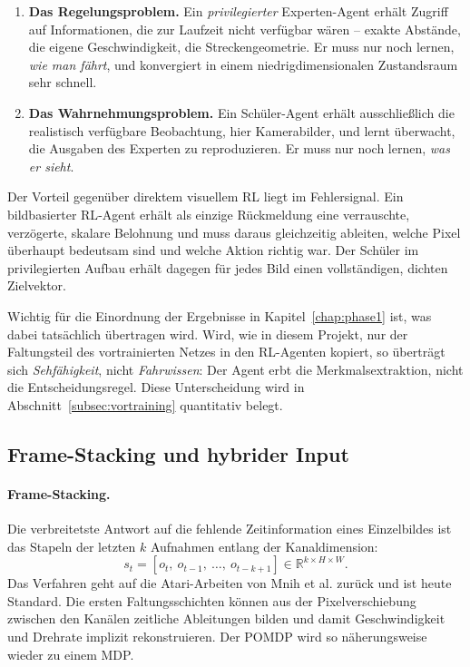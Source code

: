 \begin{enumerate}
  \item \textbf{Das Regelungsproblem.} Ein \emph{privilegierter} Experten-Agent erhält Zugriff auf Informationen, die zur Laufzeit nicht verfügbar wären -- exakte Abstände, die eigene Geschwindigkeit, die Streckengeometrie. Er muss nur noch lernen, \emph{wie man fährt}, und konvergiert in einem niedrigdimensionalen Zustandsraum sehr schnell.
  \item \textbf{Das Wahrnehmungsproblem.} Ein Schüler-Agent erhält ausschließlich die realistisch verfügbare Beobachtung, hier Kamerabilder, und lernt überwacht, die Ausgaben des Experten zu reproduzieren. Er muss nur noch lernen, \emph{was er sieht}.
\end{enumerate}

Der Vorteil gegenüber direktem visuellem \ac{RL} liegt im Fehlersignal. Ein bildbasierter \ac{RL}-Agent erhält als einzige Rückmeldung eine verrauschte, verzögerte, skalare Belohnung und muss daraus gleichzeitig ableiten, welche Pixel überhaupt bedeutsam sind und welche Aktion richtig war. Der Schüler im privilegierten Aufbau erhält dagegen für jedes Bild einen vollständigen, dichten Zielvektor.

Wichtig für die Einordnung der Ergebnisse in Kapitel~\ref{chap:phase1} ist, was dabei tatsächlich übertragen wird. Wird, wie in diesem Projekt, nur der Faltungsteil des vortrainierten Netzes in den \ac{RL}-Agenten kopiert, so überträgt sich \emph{Sehfähigkeit}, nicht \emph{Fahrwissen}: Der Agent erbt die Merkmalsextraktion, nicht die Entscheidungsregel. Diese Unterscheidung wird in Abschnitt~\ref{subsec:vortraining} quantitativ belegt.

\subsection{Frame-Stacking und hybrider Input}
\label{subsec:framestack}

\paragraph{Frame-Stacking.}
Die verbreitetste Antwort auf die fehlende Zeitinformation eines Einzelbildes ist das Stapeln der letzten $k$ Aufnahmen entlang der Kanaldimension:
\begin{equation}
  s_t = \left[ o_t,\ o_{t-1},\ \dots,\ o_{t-k+1} \right] \in \mathbb{R}^{k \times H \times W}.
  \label{eq:framestack}
\end{equation}
Das Verfahren geht auf die Atari-Arbeiten von Mnih et al. \cite{mnih2015human} zurück und ist heute Standard. Die ersten Faltungsschichten können aus der Pixelverschiebung zwischen den Kanälen zeitliche Ableitungen bilden und damit Geschwindigkeit und Drehrate implizit rekonstruieren. Der \ac{POMDP} wird so näherungsweise wieder zu einem \ac{MDP}.


